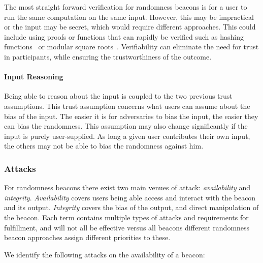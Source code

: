     The most straight forward verification for randomness beacons is for a user to run the same computation on the same input.
    However, this may be impractical or the input may be secret, which  would require different approaches.
    This could include using proofs or functions that can rapidly be verified such as hashing functions~\cite{nakamoto2008bitcoin} or modular square roots~\cite{lenstra2015random}.
    Verifiability can eliminate the need for trust in participants, while ensuring the trustworthiness of the outcome.

\paragraph{Input Reasoning}
    Being able to reason about the input is coupled to the two previous trust assumptions.
    This trust assumption concerns what users can assume about the bias of the input.
    The easier it is for adversaries to bias the input, the easier they can bias the randomness.
    This assumption may also change significantly if the input is purely user-supplied.
    As long a given user contributes their own input, the others may not be able to bias the randomness against him.


\subsubsection{Attacks}\label{ssub:security_objectives}
For randomness beacons there exist two main venues of attack: \emph{availability} and \emph{integrity}. \emph{Availability} covers users being able access and interact with the beacon and its output. \emph{Integrity} covers the bias of the output, and direct manipulation of the beacon.
Each term contains multiple types of attacks and requirements for fulfillment, and will not all be effective versus all beacons different randomness beacon approaches assign different priorities to these.

We identify the following attacks on the availability of a beacon:

